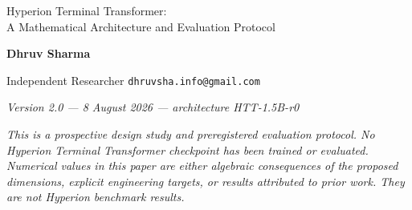 \documentclass[10pt,letterpaper]{article}
\newcommand{\1}{\mathbb{1}}
\begin{document}
\begin{center}
  {\LARGE Hyperion Terminal Transformer:\\[2pt]
   A Mathematical Architecture and Evaluation Protocol\par}
  \vspace{8pt}
  {\bfseries Dhruv Sharma\par}
  {Independent Researcher \quad \texttt{dhruvsha.info@gmail.com}\par}
  \vspace{3pt}
  {\itshape Version 2.0 --- 8 August 2026 --- architecture HTT-1.5B-r0\par}
\end{center}

\begin{center}
\begin{minipage}{0.88\linewidth}
\small\itshape
This is a prospective design study and preregistered evaluation protocol.  No Hyperion Terminal
Transformer checkpoint has been trained or evaluated.  Numerical values in this paper are either
algebraic consequences of the proposed dimensions, explicit engineering targets, or results
attributed to prior work.  They are not Hyperion benchmark results.
\end{minipage}
\end{center}
\end{document}
